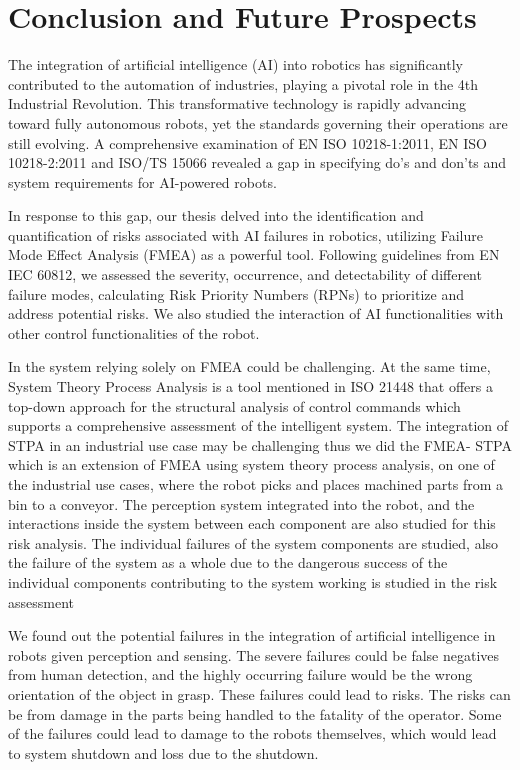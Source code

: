 {\section{Conclusion and Future Prospects}{{\normalfont\fontsize{14}{16}\bfseries}}

The integration of artificial intelligence (AI) into robotics has significantly contributed to the automation of industries, playing a pivotal role in the 4th Industrial Revolution. This transformative technology is rapidly advancing toward fully autonomous robots, yet the standards governing their operations are still evolving. A comprehensive examination of EN ISO 10218-1:2011, EN ISO 10218-2:2011  and ISO/TS 15066 revealed a gap in specifying do's and don'ts and system requirements for AI-powered robots.

In response to this gap, our thesis delved into the identification and quantification of risks associated with AI failures in robotics, utilizing Failure Mode Effect Analysis (FMEA) as a powerful tool. Following guidelines from EN IEC 60812, we assessed the severity, occurrence, and detectability of different failure modes, calculating Risk Priority Numbers (RPNs) to prioritize and address potential risks. We also studied the interaction of AI functionalities with other control functionalities of the robot.



In the system relying solely on FMEA could be challenging. At the same time, System Theory Process Analysis is a tool mentioned in ISO 21448 that offers a top-down approach for the structural analysis of control commands which supports a comprehensive assessment of the intelligent system. The integration of STPA in an industrial use case may be challenging thus we did the FMEA- STPA which is an extension of FMEA using system theory process analysis, on one of the industrial use cases, where the robot picks and places machined parts from a bin to a conveyor. The perception system integrated into the robot, and the interactions inside the system between each component are also studied for this risk analysis. The individual failures of the system components are studied, also the failure of the system as a whole due to the dangerous success of the individual components contributing to the system working is studied in the risk assessment

We found out the potential failures in the integration of artificial intelligence in robots given perception and sensing. The severe failures could be false negatives from human detection, and the highly occurring failure would be the wrong orientation of the object in grasp.    These failures could lead to risks. The risks can be from damage in the parts being handled to the fatality of the operator. Some of the failures could lead to damage to the robots themselves, which would lead to system shutdown and loss due to the shutdown.

}
